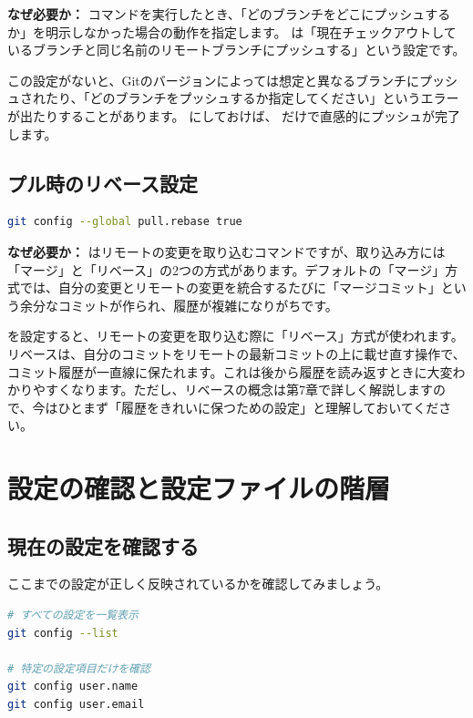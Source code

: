\textbf{なぜ必要か：}  コマンドを実行したとき、「どのブランチをどこにプッシュするか」を明示しなかった場合の動作を指定します。 は「現在チェックアウトしているブランチと同じ名前のリモートブランチにプッシュする」という設定です。

この設定がないと、Gitのバージョンによっては想定と異なるブランチにプッシュされたり、「どのブランチをプッシュするか指定してください」というエラーが出たりすることがあります。 にしておけば、 だけで直感的にプッシュが完了します。

\subsection{プル時のリベース設定}

\begin{lstlisting}[language=bash]
git config --global pull.rebase true
\end{lstlisting}

\textbf{なぜ必要か：}  はリモートの変更を取り込むコマンドですが、取り込み方には「マージ」と「リベース」の2つの方式があります。デフォルトの「マージ」方式では、自分の変更とリモートの変更を統合するたびに「マージコミット」という余分なコミットが作られ、履歴が複雑になりがちです。

 を設定すると、リモートの変更を取り込む際に「リベース」方式が使われます。リベースは、自分のコミットをリモートの最新コミットの上に載せ直す操作で、コミット履歴が一直線に保たれます。これは後から履歴を読み返すときに大変わかりやすくなります。ただし、リベースの概念は第7章で詳しく解説しますので、今はひとまず「履歴をきれいに保つための設定」と理解しておいてください。

\section{設定の確認と設定ファイルの階層}

\subsection{現在の設定を確認する}

ここまでの設定が正しく反映されているかを確認してみましょう。

\begin{lstlisting}[language=bash]
# すべての設定を一覧表示
git config --list

# 特定の設定項目だけを確認
git config user.name
git config user.email
\end{lstlisting}

